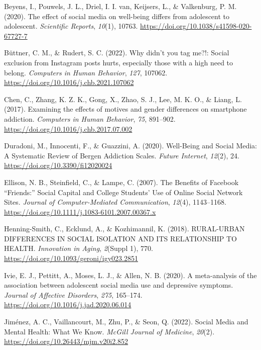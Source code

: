 \documentclass[
  letterpaper,
  DIV=11,
  numbers=noendperiod]{scrartcl}
\newlength{\cslhangindent}
\newenvironment{CSLReferences}[2] %
 {\begin{list}{}{%
  \setlength{\itemindent}{0pt}
  \setlength{\leftmargin}{0pt}
  \setlength{\parsep}{0pt}
  \ifodd #1
   \setlength{\leftmargin}{\cslhangindent}
   \setlength{\itemindent}{-1\cslhangindent}
  \fi
  \setlength{\itemsep}{#2\baselineskip}}}
 {\end{list}}
\begin{document}
\begin{CSLReferences}{1}{0}
Beyens, I., Pouwels, J. L., Driel, I. I. van, Keijsers, L., \&
Valkenburg, P. M. (2020). The effect of social media on well-being
differs from adolescent to adolescent. \emph{Scientific Reports},
\emph{10}(1), 10763. \url{https://doi.org/10.1038/s41598-020-67727-7}

Büttner, C. M., \& Rudert, S. C. (2022). Why didn't you tag me?!: Social
exclusion from Instagram posts hurts, especially those with a high need
to belong. \emph{Computers in Human Behavior}, \emph{127}, 107062.
\url{https://doi.org/10.1016/j.chb.2021.107062}

Chen, C., Zhang, K. Z. K., Gong, X., Zhao, S. J., Lee, M. K. O., \&
Liang, L. (2017). Examining the effects of motives and gender
differences on smartphone addiction. \emph{Computers in Human Behavior},
\emph{75}, 891--902. \url{https://doi.org/10.1016/j.chb.2017.07.002}

Duradoni, M., Innocenti, F., \& Guazzini, A. (2020). Well-Being and
Social Media: A Systematic Review of Bergen Addiction Scales.
\emph{Future Internet}, \emph{12}(2), 24.
\url{https://doi.org/10.3390/fi12020024}

Ellison, N. B., Steinfield, C., \& Lampe, C. (2007). The Benefits of
Facebook {``}Friends:{''} Social Capital and College Students{'} Use of
Online Social Network Sites. \emph{Journal of Computer-Mediated
Communication}, \emph{12}(4), 1143--1168.
\url{https://doi.org/10.1111/j.1083-6101.2007.00367.x}

Henning-Smith, C., Ecklund, A., \& Kozhimannil, K. (2018). RURAL-URBAN
DIFFERENCES IN SOCIAL ISOLATION AND ITS RELATIONSHIP TO HEALTH.
\emph{Innovation in Aging}, \emph{2}(Suppl 1), 770.
\url{https://doi.org/10.1093/geroni/igy023.2851}

Ivie, E. J., Pettitt, A., Moses, L. J., \& Allen, N. B. (2020). A
meta-analysis of the association between adolescent social media use and
depressive symptoms. \emph{Journal of Affective Disorders}, \emph{275},
165--174. \url{https://doi.org/10.1016/j.jad.2020.06.014}

Jiménez, A. C., Vaillancourt, M., Zhu, P., \& Seon, Q. (2022). Social
Media and Mental Health: What We Know. \emph{McGill Journal of
Medicine}, \emph{20}(2). \url{https://doi.org/10.26443/mjm.v20i2.852}


\end{CSLReferences}
\end{document}
